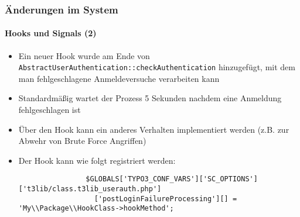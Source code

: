 
\begin{frame}[fragile]
	\frametitle{Änderungen im System}
	\framesubtitle{Hooks und Signals (2)}

	\lstset{basicstyle=\tiny\ttfamily}

	\begin{itemize}

		\item Ein neuer Hook wurde am Ende von \texttt{AbstractUserAuthentication::checkAuthentication} hinzugefügt,
			mit dem man fehlgeschlagene Anmeldeversuche verarbeiten kann

		\item Standardmäßig wartet der Prozess 5 Sekunden nachdem eine Anmeldung fehlgeschlagen ist

		\item Über den Hook kann ein anderes Verhalten implementiert werden\newline
			(z.B. zur Abwehr von Brute Force Angriffen)

		\item Der Hook kann wie folgt registriert werden:

			\begin{lstlisting}
				$GLOBALS['TYPO3_CONF_VARS']['SC_OPTIONS']['t3lib/class.t3lib_userauth.php']
				  ['postLoginFailureProcessing'][] = 'My\\Package\\HookClass->hookMethod';
			\end{lstlisting}

	\end{itemize}

\end{frame}


